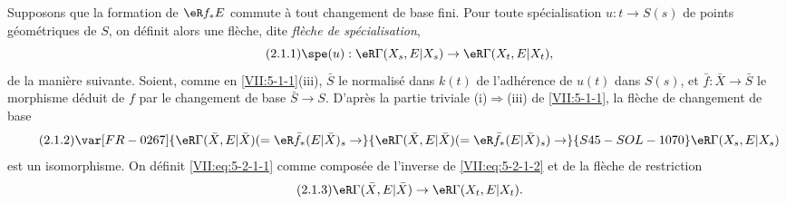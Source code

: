 Supposons que la formation de $\eR f_\ast E$ commute à tout changement de 
base fini. Pour toute spécialisation $u:t\to S(s)$ de points géométriques 
de $S$, on définit alors une flèche, dite \emph{flèche de 
spécialisation}, 
\begin{equation*}\tag{2.1.1}\label{VII:eq:5-2-1-1}
  \spe(u):\eR\Gamma(X_s,E|X_s) \to \eR\Gamma(X_t,E|X_t) \text{,}
\end{equation*}
de la manière suivante. Soient, comme en \ref{VII:5-1-1}(iii), $\bar S$ le 
normalisé dans $k(t)$ de l'adhérence de $u(t)$ dans $S(s)$, et 
$\bar f:\bar X\to \bar S$ le morphisme déduit de $f$ par le changement de 
base $\bar S\to S$. D'après la partie triviale (i)$\Rightarrow$(iii) de 
\ref{VII:5-1-1}, la flèche de changement de base
\begin{equation*}\tag{2.1.2}\label{VII:eq:5-2-1-2}
  \var[FR-0267]{\eR\Gamma(\bar X,E|\bar X) (=\eR\bar f_\ast (E|\bar X)_s \to}{\eR\Gamma(\bar X,E|\bar X) (=\eR\bar f_\ast (E|\bar X)_s) \to}{S45-SOL-1070} \eR\Gamma(X_s,E|X_s) 
\end{equation*}
est un isomorphisme. On définit \eqref{VII:eq:5-2-1-1} comme composée de 
l'inverse de \eqref{VII:eq:5-2-1-2} et de la flèche de restriction 
\begin{equation*}\tag{2.1.3}\label{VII:eq:5-2-1-3}
  \eR\Gamma(\bar X,E|\bar X) \to \eR\Gamma(X_t,E|X_t) \text{.}
\end{equation*}





\subsubsection{}\label{VII:5-2-2}

